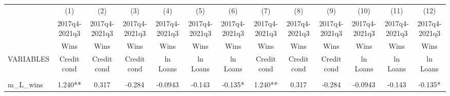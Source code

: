 \documentclass[]{article}
\begin{document}
\begin{center}
\begin{tabular}{lcccccccccccc} \hline
 & (1) & (2) & (3) & (4) & (5) & (6) & (7) & (8) & (9) & (10) & (11) & (12) \\
 & 2017q4-2021q3 & 2017q4-2021q3 & 2017q4-2021q3 & 2017q4-2021q3 & 2017q4-2021q3 & 2017q4-2021q3 & 2017q4-2021q3 & 2017q4-2021q3 & 2017q4-2021q3 & 2017q4-2021q3 & 2017q4-2021q3 & 2017q4-2021q3 \\
 & Wins & Wins & Wins & Wins & Wins & Wins & Wins & Wins & Wins & Wins & Wins & Wins \\
VARIABLES & Credit cond & Credit cond & Credit cond & ln Loans & ln Loans & ln Loans & Credit cond & Credit cond & Credit cond & ln Loans & ln Loans & ln Loans \\ \hline
\vspace{4pt} & \begin{footnotesize}\end{footnotesize} & \begin{footnotesize}\end{footnotesize} & \begin{footnotesize}\end{footnotesize} & \begin{footnotesize}\end{footnotesize} & \begin{footnotesize}\end{footnotesize} & \begin{footnotesize}\end{footnotesize} & \begin{footnotesize}\end{footnotesize} & \begin{footnotesize}\end{footnotesize} & \begin{footnotesize}\end{footnotesize} & \begin{footnotesize}\end{footnotesize} & \begin{footnotesize}\end{footnotesize} & \begin{footnotesize}\end{footnotesize} \\
m\_L\_wins & 1.240** & 0.317 & -0.284 & -0.0943 & -0.143 & -0.135* & 1.240** & 0.317 & -0.284 & -0.0943 & -0.143 & -0.135* \\

\end{tabular}
\end{center}
\end{document}
